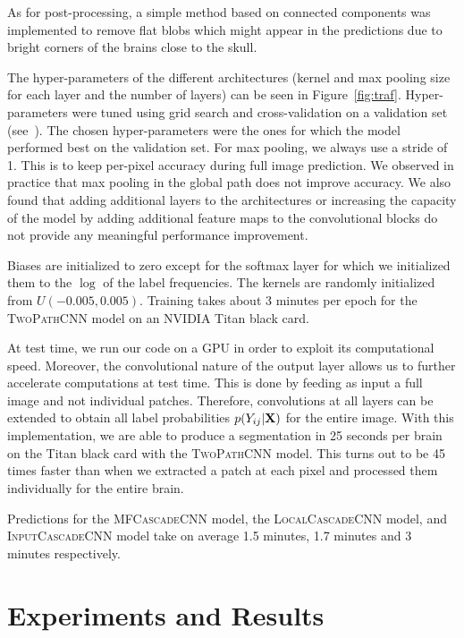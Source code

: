 \documentclass[final,5p,times,twocolumn]{elsarticle}
\begin{document}
As for post-processing, a simple method based on connected components was implemented to remove flat blobs which might appear in the predictions due to bright corners of the brains close to the skull.


The hyper-parameters of the different architectures (kernel and max pooling size for each layer and the number of layers) can be seen in Figure~\ref{fig:traf}. Hyper-parameters were tuned using grid search and cross-validation on a validation set (see~\citet{bengio2012}). The chosen hyper-parameters were the ones for which the model performed best on the validation set. For max pooling, we always use a stride of 1. This is to keep per-pixel accuracy during full image prediction. We observed in practice that max pooling in the global path does not improve accuracy.  We also found that adding additional layers to the architectures or increasing the capacity of the model by adding additional feature maps to the convolutional blocks do not provide any meaningful performance improvement. 

Biases are initialized to zero except for the softmax layer for which we initialized them to the $\log$ of the label frequencies. The kernels are randomly initialized from $U\left(-0.005 , 0.005\right)$.
Training takes about 3 minutes per epoch for the \textsc{TwoPathCNN} model on an NVIDIA Titan black card.

At test time, we run our code on a GPU in order to exploit its computational speed. Moreover, the convolutional nature of the output layer allows us to further accelerate computations at test time. This is done by feeding as input a full image and not individual patches.  Therefore, convolutions at all layers can be extended to obtain all label probabilities $p(Y_{ij}|{\bf X})$ for the entire image.
With this implementation, we are able to produce a segmentation in 25 seconds per brain on the Titan black card with the \textsc{TwoPathCNN} model. This turns out to be 45 times faster than when we extracted a patch at each pixel and processed them individually for the entire brain. 

Predictions for the \textsc{MFCascadeCNN} model, the \textsc{LocalCascadeCNN} model, and  \textsc{InputCascadeCNN} model take on average 1.5 minutes, 1.7 minutes and 3 minutes respectively. 





\section{Experiments and Results}
\label{sec:experiments}
\end{document}
